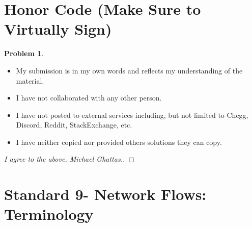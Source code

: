\documentclass[11pt]{article}
\theoremstyle{definition}
\theoremstyle{definition}
\newtheorem{required}{Problem}
\theoremstyle{definition}
\begin{document}
\section{Honor Code (Make Sure to Virtually Sign)} \label{HonorCode}

\begin{required}
\noindent 
\begin{itemize}
\item My submission is in my own words and reflects my understanding of the material.
\item I have not collaborated with any other person.
\item I have not posted to external services including, but not limited to Chegg, Discord, Reddit, StackExchange, etc.
\item I have neither copied nor provided others solutions they can copy.
\end{itemize}

\end{required}

\begin{proof}[I agree to the above, Michael Ghattas.]
\end{proof}


\newpage
\section{Standard 9- Network Flows: Terminology}
\end{document}

